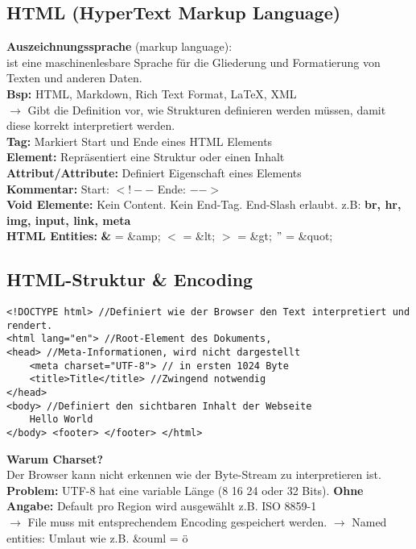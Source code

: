 \documentclass[7pt,landscape,a4paper]{scrartcl}
\begin{document}
	\setlength{\columnseprule}{0.4pt}
	\footnotesize
\begin{multicols*}{4}
\section{HTML (HyperText Markup Language)}
	\textcolor{b}{\textbf{Auszeichnungssprache} (markup language):}\\
	ist eine maschinenlesbare Sprache für die Gliederung und Formatierung von Texten und anderen Daten.\\
	\textbf{Bsp:} HTML, Markdown, Rich Text Format, LaTeX, XML\\
	$\rightarrow$ Gibt die Definition vor, wie Strukturen definieren werden müssen, damit diese korrekt interpretiert werden.\\
	\textcolor{b}{\textbf{Tag:}} Markiert Start und Ende eines HTML Elements\\
	\textcolor{b}{\textbf{Element:}} Repräsentiert eine Struktur oder einen Inhalt\\
	\textcolor{b}{\textbf{Attribut/Attribute:}} Definiert Eigenschaft eines Elements\\
	\textcolor{b}{\textbf{Kommentar:}} Start: $<!--$ Ende: $-->$\\
	\textcolor{b}{\textbf{Void Elemente:}} Kein Content. Kein End-Tag. End-Slash erlaubt. z.B: \textbf{br, hr, img, input, link, meta}\\
	\textcolor{b}{\textbf{HTML Entities:}} \textbf{\&} = \&amp; $<$ = \&lt; $>$ = \&gt; $"$ = \&quot;
\subsection{HTML-Struktur \& Encoding}
\begin{lstlisting}[style=htmlcssjs]
<!DOCTYPE html> //Definiert wie der Browser den Text interpretiert und rendert.
<html lang="en"> //Root-Element des Dokuments, 
<head> //Meta-Informationen, wird nicht dargestellt
	<meta charset="UTF-8"> // in ersten 1024 Byte
	<title>Title</title> //Zwingend notwendig
</head>
<body> //Definiert den sichtbaren Inhalt der Webseite
	Hello World
</body> <footer> </footer> </html>
\end{lstlisting}
	\textcolor{b}{\textbf{Warum Charset?}}\\
	Der Browser kann nicht erkennen wie der Byte-Stream zu interpretieren ist. \textbf{Problem:} UTF-8 hat eine variable Länge (8 16 24 oder 32 Bits). \textbf{Ohne Angabe:} Default pro Region wird ausgewählt z.B. ISO 8859-1\\
	$\rightarrow$ File muss mit entsprechendem Encoding gespeichert werden.
	$\rightarrow$ Named entities: Umlaut wie z.B. \&ouml = ö

\end{multicols*}
\end{document}
